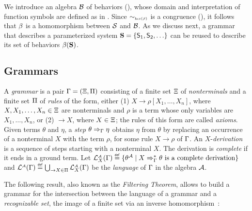 We introduce an algebra $\mathcal{B}$ of behaviors
(), whose domain and interpretation of \hrtext{}
function symbols are defined as in . Since
$\sim_{\scriptscriptstyle{\mathrm{ker}(\beta)}}$ is a \hrtext{} congruence
(), it follows that $\beta$ is a
homomorphism between $\mathcal{S}$ and $\mathcal{B}$. As we discuss next,
a grammar that describes a parameterized system $\mathbf{S}={\{ {\mathsf{S}_1,
  \mathsf{S}_2, \ldots} \}}$ can be reused to describe its set of behaviors
$\beta({\mathbf{S}})$.

\subsection{Grammars}

A \emph{grammar} is a pair $\Gamma=(\Xi,\Pi)$ consisting of
a finite set $\Xi$ of \emph{nonterminals} and a finite set
$\Pi$ of \emph{rules} of the form, either (1) $X \rightarrow
\rho[X_1,\ldots,X_n]$, where $X,X_1,\ldots,X_n \in \Xi$ are
nonterminals and $\rho$ is a term whose only variables are
$X_1,\ldots,X_n$, or (2) $\rightarrow X$, where $X \in \Xi$; the
rules of this form are called \emph{axioms}. Given terms $\theta$ and
$\eta$, a \emph{step} $\theta \Rightarrow_{\Gamma} \eta$ obtains $\eta$
from $\theta$ by replacing an occurrence of a nonterminal $X$ with the
term $\rho$, for some rule $X \rightarrow \rho$ of $\Gamma$. An
$X$-\emph{derivation} is a sequence of steps starting with a
nonterminal $X$. The derivation is \emph{complete} if it ends in a
ground term. Let $\mathcal{L}_{X}^{\scriptscriptstyle{\mathcal{A}}}({\Gamma}) \stackrel{\scriptscriptstyle{\mathsf{def}}}{=}
\{\theta^{\mathcal{A}} \mid X \Rightarrow_{\Gamma}^* \theta \text{ is a
  complete derivation}\}$ and $\mathcal{L}_{}^{\scriptscriptstyle{\mathcal{A}}}({\Gamma}) \stackrel{\scriptscriptstyle{\mathsf{def}}}{=}
\bigcup_{\rightarrow X \in \Pi} \mathcal{L}_{X}^{\scriptscriptstyle{\mathcal{A}}}({\Gamma})$
be the \emph{language} of $\Gamma$ in the algebra $\mathcal{A}$.

The following result, also known as the \emph{Filtering Theorem},
allows to build a grammar for the intersection between the language of
a grammar and a \emph{recognizable set}, \ie the image of a finite
set via an inverse homomorphism~\cite[Theorem 3.88]{courcelle_engelfriet_2012}:


